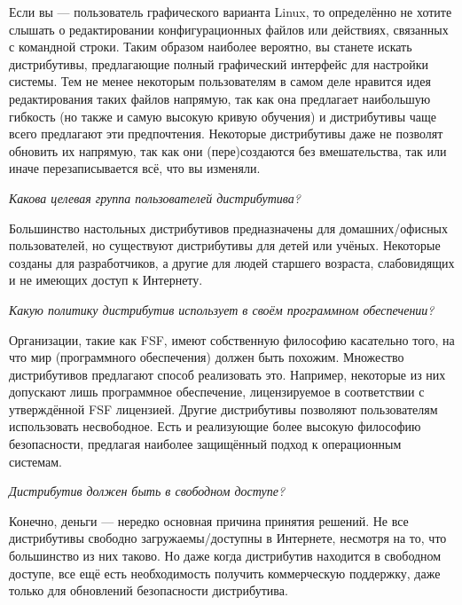 \documentclass[12pt]{book}
\begin{document}
Если вы --- пользователь графического варианта Linux, то определённо не хотите слышать о редактировании конфигурационных файлов или действиях, связанных с командной строки. Таким образом наиболее вероятно, вы станете искать дистрибутивы, предлагающие полный графический интерфейс для настройки системы. Тем не менее некоторым пользователям в самом деле нравится идея редактирования таких файлов напрямую, так как она предлагает наибольшую гибкость (но также и самую высокую кривую обучения) и дистрибутивы чаще всего предлагают эти предпочтения. Некоторые дистрибутивы даже не позволят обновить их напрямую, так как они  (пере)создаются без вмешательства, так или иначе перезаписывается всё, что вы изменяли.

\begin{flushright}
{\color{gentoo}\emph{Какова целевая группа пользователей дистрибутива?}}
\end{flushright}

Большинство настольных дистрибутивов предназначены для домашних/офисных пользователей, но существуют дистрибутивы для детей или учёных. Некоторые созданы для разработчиков, а другие для людей старшего возраста, слабовидящих и не имеющих доступ к Интернету.

\begin{flushright}
{\color{gentoo}\emph{Какую политику дистрибутив использует в своём программном обеспечении?}}
\end{flushright}

Организации, такие как FSF, имеют собственную философию касательно того, на что мир (программного обеспечения) должен быть похожим. Множество дистрибутивов предлагают способ реализовать это. Например, некоторые из них допускают лишь программное обеспечение, лицензируемое в соответствии с утверждённой FSF лицензией. Другие дистрибутивы позволяют пользователям использовать несвободное. Есть и реализующие более высокую философию безопасности, предлагая наиболее защищённый подход к операционным системам.

\begin{flushright}
{\color{gentoo}\emph{Дистрибутив должен быть в свободном доступе?}}
\end{flushright}

Конечно, деньги --- нередко основная причина принятия решений. Не все дистрибутивы свободно загружаемы/доступны в Интернете, несмотря на то, что большинство из них таково. Но даже когда дистрибутив находится в свободном доступе, все ещё есть необходимость получить коммерческую поддержку, даже только для обновлений безопасности дистрибутива.
\end{document}
